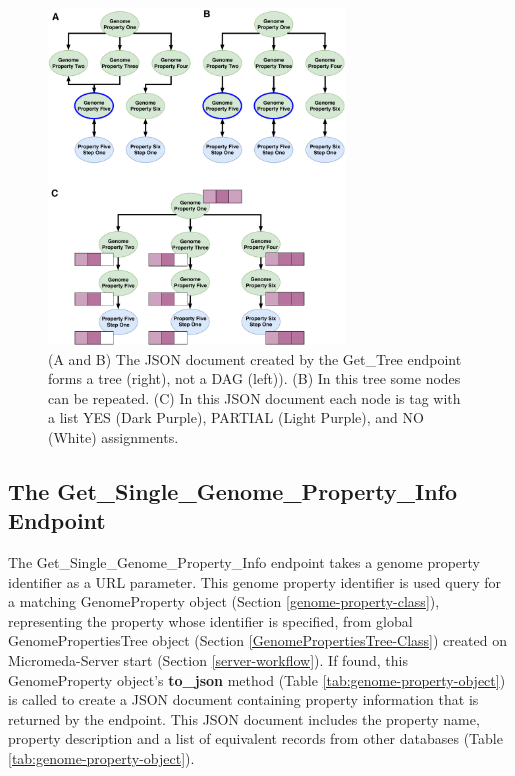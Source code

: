 \begin{figure}[!ht]
  \centering
	\includegraphics[width=0.70\textwidth]{media/Tree-JSON.pdf}
	 \caption{ (A and B) The JSON document created by the Get\_Tree endpoint forms a tree (right), not a DAG (left)). (B) In this tree some nodes can be repeated. (C) In this JSON document each node is tag with a list YES (Dark Purple), PARTIAL (Light Purple), and NO (White) assignments.}
	 \label{fig:tree-json}
\end{figure}


\subsection{The Get\_Single\_Genome\_Property\_Info Endpoint}

The Get\_Single\_Genome\_Property\_Info endpoint takes a genome property identifier as a URL parameter. This genome property identifier is used query for a matching GenomeProperty object (Section \ref{genome-property-class}), representing the property whose identifier is specified, from global GenomePropertiesTree object (Section \ref{GenomePropertiesTree-Class}) created on Micromeda-Server start (Section \ref{server-workflow}). If found, this GenomeProperty object's \textbf{to\_json} method (Table \ref{tab:genome-property-object}) is called to create a JSON document containing property information that is returned by the endpoint. This JSON document includes the property name, property description and a list of equivalent records from other databases (Table \ref{tab:genome-property-object}).


